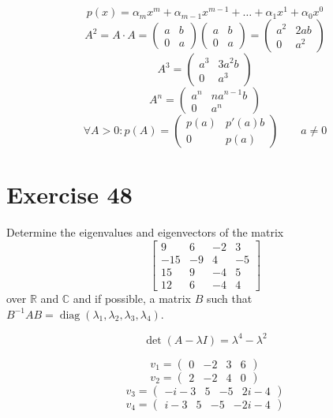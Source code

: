 \documentclass[a4paper]{article}
\theoremstyle{definition}
\begin{document}
\[ p(x) = \alpha_m x^m + \alpha_{m-1} x^{m-1} + \dots + \alpha_1 x^1 + \alpha_0 x^0 \]
\[ A^2 = A \cdot A = \begin{pmatrix} a & b \\ 0 & a \end{pmatrix} \begin{pmatrix} a & b \\ 0 & a \end{pmatrix} = \begin{pmatrix} a^2 & 2ab \\ 0 & a^2 \end{pmatrix} \]
\[ A^3 = \begin{pmatrix} a^3 & 3a^2 b \\ 0 & a^3 \end{pmatrix} \]
\[ A^n = \begin{pmatrix} a^n & na^{n-1} b \\ 0 & a^n \end{pmatrix} \]
\[
  \forall A > 0:
  p(A) = \begin{pmatrix}
    p(a) & p'(a) b \\
    0 & p(a)
  \end{pmatrix} \qquad a \neq 0
\]

\section*{Exercise 48}
\begin{ex}
  Determine the eigenvalues and eigenvectors of the matrix
  \[
    \begin{bmatrix}
      9 & 6 & -2 & 3 \\
      -15 & -9 & 4 & -5 \\
      15 & 9 & -4 & 5 \\
      12 & 6 & -4 & 4
    \end{bmatrix}
  \]
  over $\mathbb R$ and $\mathbb C$ and if possible, a matrix $B$ such that $B^{-1} AB = \operatorname{diag}(\lambda_1, \lambda_2, \lambda_3, \lambda_4)$.
\end{ex}

\[ \det(A - \lambda I) = \lambda^4 - \lambda^2 \]

\[ v_1 = \begin{pmatrix} 0 & -2 & 3 & 6 \end{pmatrix} \]
\[ v_2 = \begin{pmatrix} 2 & -2 & 4 & 0 \end{pmatrix} \]
\[ v_3 = \begin{pmatrix} -i-3 & 5 & -5 & 2i-4 \end{pmatrix} \]
\[ v_4 = \begin{pmatrix} i-3 & 5 & -5 & -2i-4 \end{pmatrix} \]
\end{document}
